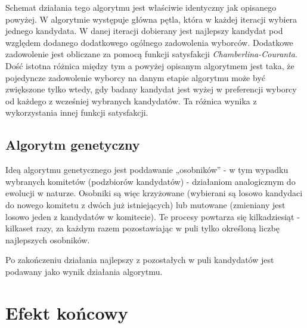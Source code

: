 \documentclass[polish,11pt]{aghthesis}
\begin{document}
Schemat działania tego algorytmu jest właściwie identyczny jak opisanego powyżej. W algorytmie
występuje główna pętla, która w każdej iteracji wybiera jednego kandydata. W danej iteracji
dobierany jest najlepszy kandydat pod względem dodanego dodatkowego ogólnego
zadowolenia wyborców. Dodatkowe zadowolenie jest obliczane za pomocą funkcji satysfakcji \textit{Chamberlina-Couranta}. Dość istotna różnica między tym a powyżej opisanym algorytmem jest
taka, że pojedyncze zadowolenie wyborcy na danym etapie algorytmu może być zwiększone
tylko wtedy, gdy badany kandydat jest wyżej w preferencji wyborcy od każdego z wcześniej
wybranych kandydatów. Ta różnica wynika z wykorzystania innej funkcji satysfakcji.

\subsection{Algorytm genetyczny}
Ideą algorytmu genetycznego jest poddawanie „osobników” - w tym wypadku wybranych komitetów (podzbiorów kandydatów) - działaniom analogicznym do ewolucji w naturze. Osobniki są więc krzyżowane (wybierani są losowo kandydaci do nowego komitetu z dwóch już istniejących) lub mutowane (zmieniany jest losowo jeden z kandydatów w komitecie). Te procesy powtarza się kilkadziesiąt - kilkaset razy, za każdym razem pozostawiając w puli tylko określoną liczbę najlepszych osobników.

Po zakończeniu działania najlepszy z pozostałych w puli kandydatów jest podawany jako wynik działania algorytmu.

\newpage
\section{Efekt końcowy}
\end{document}
